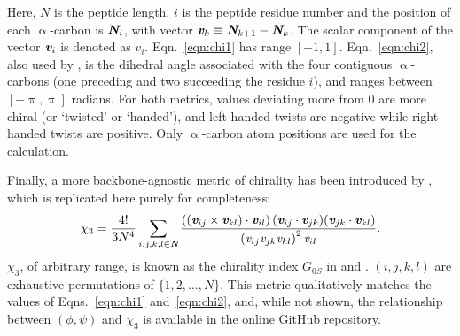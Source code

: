\documentclass[fleqn,10pt,lineno]{wlpeerj} %
\newcommand{\n}[1]{{\color{black}#1}} %
\newcommand{\Eqn}[1]{Eqn.~\ref{#1}}
\newcommand{\Eqns}[1]{Eqns.~\ref{#1}}
\begin{document}
Here, $N$ is the peptide length, $i$ is the peptide residue number and the position of each $\upalpha$-carbon is $\textit{\textbf{N}}_i$, with vector $\textit{\textbf{v}}_{k} \equiv \textit{\textbf{N}}_{k+1} - \textit{\textbf{N}}_{k}$. 
The scalar component of the vector $\textit{\textbf{v}}_i$ is denoted as $\textit{v}_i$. 
\n{\Eqn{eqn:chi1} has range $[-1,1]$. \Eqn{eqn:chi2}, also used by \cite{Gruziel2013}, is the dihedral angle associated with the four contiguous $\upalpha$-carbons (one preceding and two succeeding the residue $i$), and ranges between $[-\uppi,\uppi]$ radians. For both metrics, values}  deviating more from 0 are more chiral (or `twisted' or `handed'), and left-handed twists are negative while right-handed twists are positive. Only $
\upalpha$-carbon atom positions are used for the calculation. 

\n{Finally, a more backbone-agnostic metric of chirality has been introduced by \cite{Solymosi2002}, which is replicated here purely for completeness:
\begin{equation}\label{eqn:chi3}
\displaystyle \chi_3 = \frac{4!}{3N^4} \sum_{i,j,k,l \in \textit{\textbf{N}}} \frac{\left((\textit{\textbf{v}}_{ij} \times \textit{\textbf{v}}_{kl}) \cdot \textit{\textbf{v}}_{il}\right) (\textit{\textbf{v}}_{ij} \cdot \textit{\textbf{v}}_{jk}) (\textit{\textbf{v}}_{jk} \cdot \textit{\textbf{v}}_{kl})} {\left(\textit{v}_{ij} \textit{v}_{jk} \textit{v}_{kl}\right)^2 \textit{v}_{il}}.
\end{equation}
$\chi_3$, of arbitrary range, is known as the chirality index $G_{0S}$ in \cite{Solymosi2002} and \cite{Neal2003}. $(i,j,k,l)$ are exhaustive permutations of $\{1,2,\ldots,N\}$. This metric qualitatively matches the values of \Eqns{eqn:chi1} and~\ref{eqn:chi2}, and, while not shown, the relationship between $(\phi,\psi)$ and $\chi_3$ is available in the online GitHub repository.}
\end{document}
